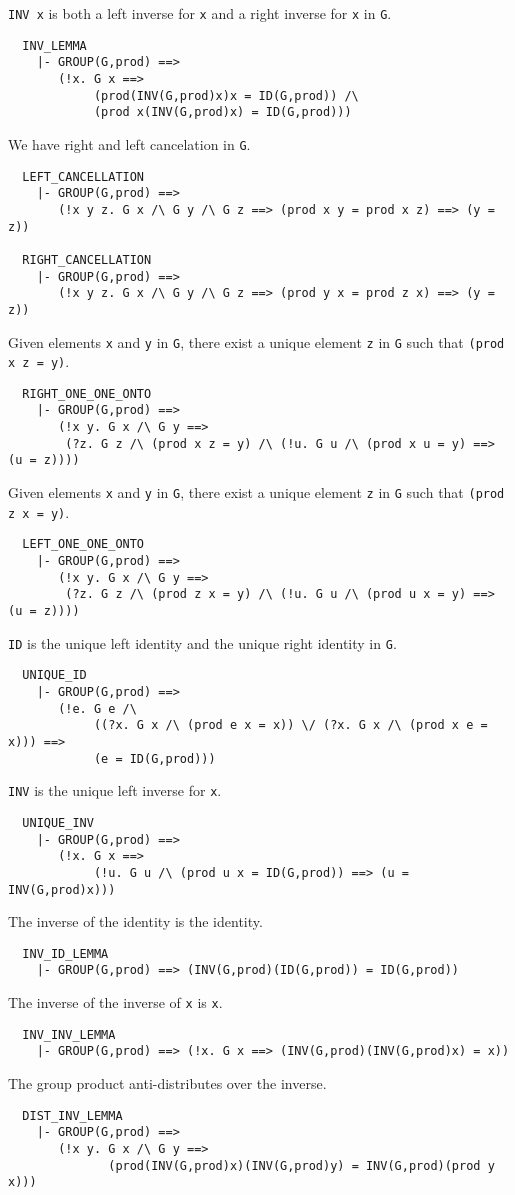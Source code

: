 {\tt INV x} is both a left inverse for {\tt x} and a right inverse for {\tt x}
in {\tt G}.
\begin{verbatim}
  INV_LEMMA
    |- GROUP(G,prod) ==>
       (!x. G x ==>
            (prod(INV(G,prod)x)x = ID(G,prod)) /\
            (prod x(INV(G,prod)x) = ID(G,prod)))

\end{verbatim}
We have right and left cancelation in {\tt G}.
\begin{verbatim}
  LEFT_CANCELLATION
    |- GROUP(G,prod) ==>
       (!x y z. G x /\ G y /\ G z ==> (prod x y = prod x z) ==> (y = z))

  RIGHT_CANCELLATION
    |- GROUP(G,prod) ==>
       (!x y z. G x /\ G y /\ G z ==> (prod y x = prod z x) ==> (y = z))

\end{verbatim}
Given elements {\tt x} and {\tt y} in {\tt G}, there exist a unique
element {\tt z} in {\tt G} such that \mbox{\tt (prod x z = y)}.
\begin{verbatim}
  RIGHT_ONE_ONE_ONTO
    |- GROUP(G,prod) ==>
       (!x y. G x /\ G y ==>
        (?z. G z /\ (prod x z = y) /\ (!u. G u /\ (prod x u = y) ==> (u = z))))

\end{verbatim}
Given elements {\tt x} and {\tt y} in {\tt G}, there exist a unique
element {\tt z} in {\tt G} such that \mbox{\tt (prod z x = y)}.
\begin{verbatim}
  LEFT_ONE_ONE_ONTO
    |- GROUP(G,prod) ==>
       (!x y. G x /\ G y ==>
        (?z. G z /\ (prod z x = y) /\ (!u. G u /\ (prod u x = y) ==> (u = z))))

\end{verbatim}
{\tt ID} is the unique left identity and the unique right identity in {\tt G}.
\begin{verbatim}
  UNIQUE_ID
    |- GROUP(G,prod) ==>
       (!e. G e /\
            ((?x. G x /\ (prod e x = x)) \/ (?x. G x /\ (prod x e = x))) ==>
            (e = ID(G,prod)))

\end{verbatim}
{\tt INV} is the unique left inverse for {\tt x}.
\begin{verbatim}
  UNIQUE_INV
    |- GROUP(G,prod) ==>
       (!x. G x ==>
            (!u. G u /\ (prod u x = ID(G,prod)) ==> (u = INV(G,prod)x)))

\end{verbatim}
The inverse of the identity is the identity.
\begin{verbatim}
  INV_ID_LEMMA
    |- GROUP(G,prod) ==> (INV(G,prod)(ID(G,prod)) = ID(G,prod))
\end{verbatim}
The inverse of the inverse of {\tt x} is {\tt x}.
\begin{verbatim}
  INV_INV_LEMMA
    |- GROUP(G,prod) ==> (!x. G x ==> (INV(G,prod)(INV(G,prod)x) = x))

\end{verbatim}
The group product anti-distributes over the inverse.
\begin{verbatim}
  DIST_INV_LEMMA
    |- GROUP(G,prod) ==>
       (!x y. G x /\ G y ==>
              (prod(INV(G,prod)x)(INV(G,prod)y) = INV(G,prod)(prod y x)))
\end{verbatim}

